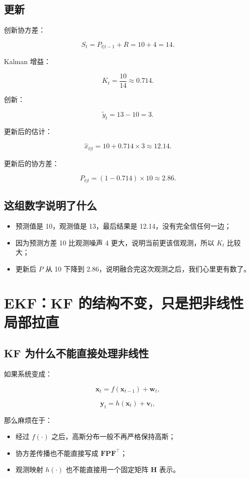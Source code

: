 \documentclass[12pt,a4paper]{ctexart}
\begin{document}
\subsection{更新}

创新协方差：

\[
S_t = P_{t|t-1} + R = 10 + 4 = 14.
\]

Kalman 增益：

\[
K_t = \frac{10}{14} \approx 0.714.
\]

创新：

\[
\tilde{y}_t = 13 - 10 = 3.
\]

更新后的估计：

\[
\hat{x}_{t|t}
= 10 + 0.714 \times 3
\approx 12.14.
\]

更新后的协方差：

\[
P_{t|t} = (1 - 0.714)\times 10 \approx 2.86.
\]

\subsection{这组数字说明了什么}

\begin{itemize}
  \item 预测值是 10，观测值是 13，最后结果是 12.14，没有完全信任何一边；
  \item 因为预测方差 10 比观测噪声 4 更大，说明当前更该信观测，所以 \(K_t\) 比较大；
  \item 更新后 \(P\) 从 10 下降到 2.86，说明融合完这次观测之后，我们心里更有数了。
\end{itemize}

\section{EKF：KF 的结构不变，只是把非线性局部拉直}

\subsection{KF 为什么不能直接处理非线性}

如果系统变成：

\[
\bm{x}_t = f(\bm{x}_{t-1}) + \bm{w}_t,
\]

\[
\bm{y}_t = h(\bm{x}_t) + \bm{v}_t,
\]

那么麻烦在于：

\begin{itemize}
  \item 经过 \(f(\cdot)\) 之后，高斯分布一般不再严格保持高斯；
  \item 协方差传播也不能直接写成 \(\bm{F}\bm{P}\bm{F}^\top\)；
  \item 观测映射 \(h(\cdot)\) 也不能直接用一个固定矩阵 \(\bm{H}\) 表示。
\end{itemize}
\end{document}
